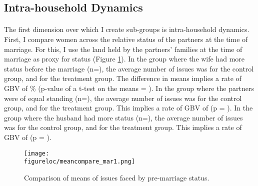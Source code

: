 \documentclass[11pt,a4paper]{scrartcl} %
\newcommand{\figureloc}{C:/Users/Koen/Dropbox/PhD/Papers/CongoGBV/Figures}
\begin{document}
\subsection*{Intra-household Dynamics}

\paragraph{}
 The first dimension over which I create sub-groups is intra-household dynamics. First, I compare women across the relative status of the partners at the time of marriage. For this, I use the land held by the partners' families at the time of marriage as proxy for status (Figure \ref{fig:meancompare_mar1}). In the group where the wife had more status before the marriage (n=), the average number of issues was  for the control group, and  for the treatment group. The difference in means implies a rate of GBV of \% (p-value of a t-test on the means = ). In the group where the partners were of equal standing (n=), the average number of issues was  for the control group, and  for the treatment group. This implies a rate of GBV of  (p = ). In the group where the husband had more status (n=), the average number of issues was  for the control group, and  for the treatment group. This implies a rate of GBV of  (p = ).

\begin{figure}[H]
  \texttt{[image: \\figureloc/meancompare\_mar1.png]}
  \caption{Comparison of means of issues faced by pre-marriage status.}
  \label{fig:meancompare_mar1}
\end{figure}
\end{document}
